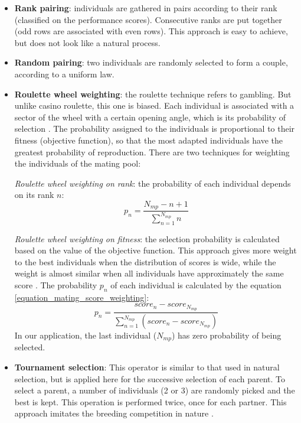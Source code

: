 \documentclass[twocol]{ametsoc}
\begin{document}
\begin{itemize}
	\item \textbf{Rank pairing}: individuals are gathered in pairs according to their rank (classified on the performance scores). Consecutive ranks are put together (odd rows are associated with even rows). This approach is easy to achieve, but does not look like a natural process.
	
	\item \textbf{Random pairing}: two individuals are randomly selected to form a couple, according to a uniform law.
	
	\item \textbf{Roulette wheel weighting}: the roulette technique refers to gambling. But unlike casino roulette, this one is biased. Each individual is associated with a sector of the wheel with a certain opening angle, which is its probability of selection \citep{Haupt2004}. The probability assigned to the individuals is proportional to their fitness (objective function), so that the most adapted individuals have the greatest probability of reproduction. There are two techniques for weighting the individuals of the mating pool:
	
	\textit{Roulette wheel weighting on rank}: the probability of each individual depends on its rank $n$:
	\begin{equation}
	p_{n}=\dfrac{N_{mp}-n+1}{\sum^{N_{mp}}_{n=1}n}
	\label{equation_mating_rank_weighting}
	\end{equation}
		
	\textit{Roulette wheel weighting on fitness}: the selection probability is calculated based on the value of the objective function. This approach gives more weight to the best individuals when the distribution of scores is wide, while the weight is almost similar when all individuals have approximately the same score \citep{Haupt2004}. The probability $p_{n}$ of each individual is calculated by the equation \ref{equation_mating_score_weighting}:
	\begin{equation}
	p_{n}=\frac{score_{n}-score_{N_{mp}}}{\sum_{n=1}^{N_{mp}} (score_{n}-score_{N_{mp}})}
	\label{equation_mating_score_weighting}
	\end{equation}
	In our application, the last individual ($N_{mp}$) has zero probability of being selected.

	
	\item \textbf{Tournament selection}: This operator is similar to that used in natural selection, but is applied here for the successive selection of each parent. To select a parent, a number of individuals (2 or 3) are randomly picked and the best is kept. This operation is performed twice, once for each partner. This approach imitates the breeding competition in nature \citep{Haupt2004}.
\end{itemize}
\end{document}
